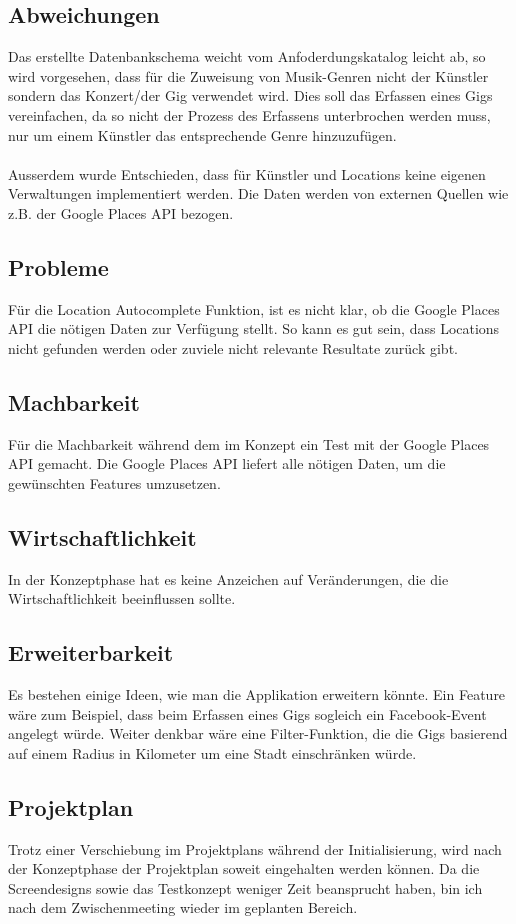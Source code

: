 \subsection{Abweichungen}

Das erstellte Datenbankschema weicht vom Anfoderdungskatalog leicht ab,
so wird vorgesehen, dass für die Zuweisung von Musik-Genren nicht der Künstler
sondern das Konzert/der Gig verwendet wird.
Dies soll das Erfassen eines Gigs vereinfachen, da so nicht der Prozess des
Erfassens unterbrochen werden muss, nur um einem Künstler das entsprechende
Genre hinzuzufügen.\\
\\
Ausserdem wurde Entschieden, dass für Künstler und Locations keine eigenen
Verwaltungen implementiert werden. Die Daten werden von externen Quellen
wie z.B. der Google Places API bezogen.

\subsection{Probleme}

Für die Location Autocomplete Funktion, ist es nicht klar, ob die
Google Places API die nötigen Daten zur Verfügung stellt. So kann es gut sein,
dass Locations nicht gefunden werden oder zuviele nicht relevante Resultate
zurück gibt.

\subsection{Machbarkeit}

Für die Machbarkeit während dem im Konzept ein Test mit der Google Places API
gemacht. Die Google Places API liefert alle nötigen Daten, um die gewünschten
Features umzusetzen.

\subsection{Wirtschaftlichkeit}

In der Konzeptphase hat es keine Anzeichen auf Veränderungen, die die
Wirtschaftlichkeit beeinflussen sollte.

\subsection{Erweiterbarkeit}

Es bestehen einige Ideen, wie man die Applikation erweitern könnte. Ein Feature
wäre zum Beispiel, dass beim Erfassen eines Gigs sogleich ein Facebook-Event
angelegt würde. Weiter denkbar wäre eine Filter-Funktion, die die Gigs basierend
auf einem Radius in Kilometer um eine Stadt einschränken würde.

\subsection{Projektplan}

Trotz einer Verschiebung im Projektplans während der Initialisierung, wird nach
der Konzeptphase der Projektplan soweit eingehalten werden können. Da die
Screendesigns sowie das Testkonzept weniger Zeit beansprucht haben, bin ich
nach dem Zwischenmeeting wieder im geplanten Bereich.
